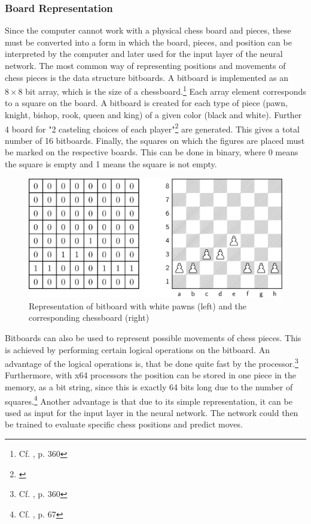 \subsubsection{Board Representation}

Since the computer cannot work with a physical chess board and pieces, these must be converted into a form in which the board, pieces, and position can be interpreted by the computer and later used for the input layer of the neural network. The most common way of representing positions and movements of chess pieces is the data structure bitboards. A bitboard is implemented as an $8 \times 8$ bit array, which is the size of a chessboard.\footnote{Cf. \cite{boskovic-2005-bb}, p. 360} Each array element corresponds to a square on the board. A bitboard is created for each type of piece (pawn, knight, bishop, rook, queen and king) of a given color (black and white). Further 4 board for "2 casteling choices of each player"\footnote{\cite{zang-etal-2019-automated}} are generated. This gives a total number of 16 bitboards. Finally, the squares on which the figures are placed must be marked on the respective boards. This can be done in binary, where 0 means the square is empty and 1 means the square is not empty.

\begin{figure}[h]
\centering
\includegraphics[scale=0.13]{graphics/bitboard/bitboard_and_chessboard.png}
\caption{Representation of bitboard with white pawns (left) and the corresponding chessboard (right)}
\end{figure}

Bitboards can also be used to represent possible movements of chess pieces. This is achieved by performing certain logical operations on the bitboard. An advantage of the logical operations is, that be done quite fast by the processor.\footnote{Cf. \cite{boskovic-2005-bb}, p. 360} Furthermore, with x64 processors the position can be stored in one piece in the memory, as a bit string, since this is exactly 64 bits long due to the number of squares.\footnote{Cf. \cite{segundo-2005-bb}, p. 67} Another advantage is that due to its simple representation, it can be used as input for the input layer in the neural network. The network could then be trained to evaluate specific chess positions and predict moves.
